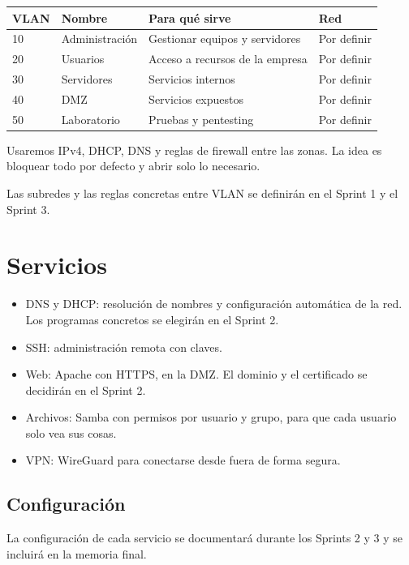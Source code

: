 \documentclass[12pt,a4paper]{article}
\begin{document}
\begin{longtable}{|p{}|p{}|p{}|p{}|}
\hline
\textbf{VLAN} & \textbf{Nombre} & \textbf{Para qué sirve} & \textbf{Red}\\ \hline
10 & Administración & Gestionar equipos y servidores & Por definir\\ \hline
20 & Usuarios & Acceso a recursos de la empresa & Por definir\\ \hline
30 & Servidores & Servicios internos & Por definir\\ \hline
40 & DMZ & Servicios expuestos & Por definir\\ \hline
50 & Laboratorio & Pruebas y pentesting & Por definir\\ \hline
\end{longtable}

Usaremos IPv4, DHCP, DNS y reglas de firewall entre las zonas. La idea es bloquear todo por defecto y abrir solo lo necesario.

Las subredes y las reglas concretas entre VLAN se definirán en el Sprint 1 y el Sprint 3.

\section{Servicios}
\begin{itemize}
\item DNS y DHCP: resolución de nombres y configuración automática de la red. Los programas concretos se elegirán en el Sprint 2.
\item SSH: administración remota con claves.
\item Web: Apache con HTTPS, en la DMZ. El dominio y el certificado se decidirán en el Sprint 2.
\item Archivos: Samba con permisos por usuario y grupo, para que cada usuario solo vea sus cosas.
\item VPN: WireGuard para conectarse desde fuera de forma segura.
\end{itemize}

\subsection{Configuración}
La configuración de cada servicio se documentará durante los Sprints 2 y 3 y se incluirá en la memoria final.
\end{document}

